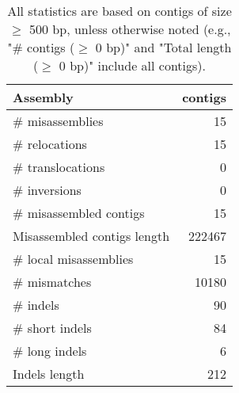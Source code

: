 \documentclass[12pt,a4paper]{article}
\begin{document}
\begin{table}[ht]
\begin{center}
\caption{All statistics are based on contigs of size $\geq$ 500 bp, unless otherwise noted (e.g., "\# contigs ($\geq$ 0 bp)" and "Total length ($\geq$ 0 bp)" include all contigs).}
\begin{tabular}{|l*{1}{|r}|}
\hline
Assembly & contigs \\ \hline
\# misassemblies & 15 \\ \hline
\hspace{5mm}\# relocations & 15 \\ \hline
\hspace{5mm}\# translocations & 0 \\ \hline
\hspace{5mm}\# inversions & 0 \\ \hline
\# misassembled contigs & 15 \\ \hline
Misassembled contigs length & 222467 \\ \hline
\# local misassemblies & 15 \\ \hline
\# mismatches & 10180 \\ \hline
\# indels & 90 \\ \hline
\hspace{5mm}\# short indels & 84 \\ \hline
\hspace{5mm}\# long indels & 6 \\ \hline
Indels length & 212 \\ \hline
\end{tabular}
\end{center}
\end{table}
\end{document}
